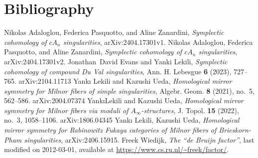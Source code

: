 \chapter{Bibliography}

\def\cprime{$'$} \def\cprime{$'$}
\providecommand{\bysame}{\leavevmode\hbox to3em{\hrulefill}\thinspace}
\providecommand{\MR}{\relax\ifhmode\unskip\space\fi MR }
\providecommand{\MRhref}[2]{%
  \href{http://www.ams.org/mathscinet-getitem?mr=#1}{#2}
}
\providecommand{\href}[2]{#2}
\newcommand{\arXiv}[1]{\href{https://arxiv.org/abs/#1}{arXiv:#1}}

\begin{thebibliography}{APZv1}
Nikolas Adaloglou, Federica Pasquotto, and Aline Zanardini,
\emph{Symplectic cohomology of {$cA_n$} singularities},
\arXiv{2404.17301v1}.
Nikolas Adaloglou, Federica Pasquotto, and Aline Zanardini,
\emph{Symplectic cohomology of {$cA_n$} singularities},
\arXiv{2404.17301v2}.
Jonathan~David Evans and Yanki Lekili,
\emph{Symplectic cohomology of compound {D}u {V}al singularities},
Ann. H. Lebesgue \textbf{6} (2023), 727--765. \arXiv{2104.11713}
Yank{\i} Lekili and Kazushi Ueda, \emph{Homological mirror symmetry for {M}ilnor fibers of simple singularities}, Algebr. Geom. \textbf{8} (2021), no.~5, 562--586. \arXiv{2004.07374}
Yank\i Lekili and Kazushi Ueda, \emph{Homological mirror symmetry for {M}ilnor fibers via moduli of {$A_\infty$}-structures}, J. Topol. \textbf{15} (2022), no.~3, 1058--1106. \arXiv{1806.04345}
Yank{\i} Lekili, Kazushi Ueda,
\emph{Homological mirror symmetry for Rabinowitz Fukaya categories
of Milnor fibers of Brieskorn-Pham singularities},
\arXiv{2406.15915}.
Freek Wiedijk,
\emph{The ``de {Bruijn} factor''},
last modified on 2012-03-01,
available at \url{https://www.cs.ru.nl/~freek/factor/}.
\end{thebibliography}